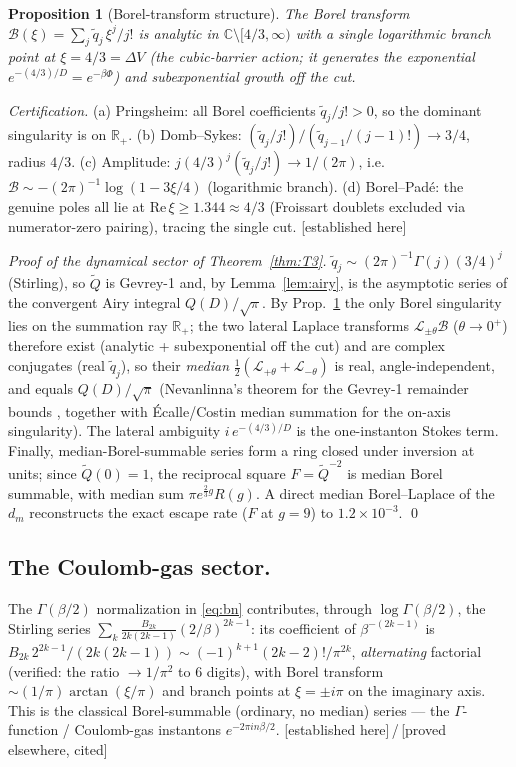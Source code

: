 \documentclass[11pt,reqno]{amsart}
\theoremstyle{plain}
\newtheorem{proposition}[theorem]{Proposition}
\theoremstyle{definition}
\theoremstyle{remark}
\newcommand{\R}{\mathbb{R}}
\newcommand{\C}{\mathbb{C}}
\newcommand{\tagPr}{{\footnotesize\textsf{[established here]}}}
\newcommand{\tagP}{{\footnotesize\textsf{[proved elsewhere, cited]}}}
\begin{document}
\begin{proposition}[Borel-transform structure]\label{prop:borel}
The Borel transform $\mathcal B(\xi)=\sum_j \tilde q_j\,\xi^j/j!$ is analytic in $\C\setminus[4/3,\infty)$
with a single logarithmic branch point at $\xi=4/3=\Delta V$ (the cubic-barrier action; it generates
the exponential $e^{-(4/3)/D}=e^{-\beta\Phi}$) and subexponential growth off the cut.
\end{proposition}
\emph{Certification.} (a) Pringsheim: all Borel coefficients $\tilde q_j/j!>0$, so the dominant
singularity is on $\R_+$. (b) Domb--Sykes: $(\tilde q_j/j!)/(\tilde q_{j-1}/(j-1)!)\to 3/4$, radius
$4/3$. (c) Amplitude: $j(4/3)^j(\tilde q_j/j!)\to 1/(2\pi)$, i.e.\ $\mathcal B\sim-(2\pi)^{-1}\log(1-3\xi/4)$
(logarithmic branch). (d) Borel--Pad\'e: the genuine poles all lie at $\mathrm{Re}\,\xi\ge1.344\approx4/3$
(Froissart doublets excluded via numerator-zero pairing), tracing the single cut. \tagPr

\begin{proof}[Proof of the dynamical sector of Theorem~\ref{thm:T3}]
$\tilde q_j\sim(2\pi)^{-1}\Gamma(j)(3/4)^j$ (Stirling), so $\tilde Q$ is Gevrey-1 and, by
Lemma~\ref{lem:airy}, is the asymptotic series of the convergent Airy integral $Q(D)/\sqrt\pi$. By
Prop.~\ref{prop:borel} the only Borel singularity lies on the summation ray $\R_+$; the two lateral
Laplace transforms $\mathcal L_{\pm\theta}\mathcal B$ ($\theta\to0^+$) therefore exist (analytic +
subexponential off the cut) and are complex conjugates (real $\tilde q_j$), so their \emph{median}
$\tfrac12(\mathcal L_{+\theta}+\mathcal L_{-\theta})$ is real, angle-independent, and equals
$Q(D)/\sqrt\pi$ (Nevanlinna's theorem for the Gevrey-1 remainder bounds \cite{Sokal}, together with
\'Ecalle/Costin median summation \cite{Costin} for the on-axis singularity). The lateral ambiguity
$i\,e^{-(4/3)/D}$ is the one-instanton Stokes term. Finally, median-Borel-summable series form a ring
closed under inversion at units; since $\tilde Q(0)=1$, the reciprocal square $F=\tilde Q^{-2}$ is
median Borel summable, with median sum $\pi e^{\frac23 g}R(g)$. A direct median Borel--Laplace of the
$d_m$ reconstructs the exact escape rate ($F$ at $g=9$) to $1.2\times10^{-3}$. \qed
\end{proof}

\subsection{The Coulomb-gas sector.}
The $\Gamma(\beta/2)$ normalization in \eqref{eq:bn} contributes, through
$\log\Gamma(\beta/2)$, the Stirling series $\sum_k \tfrac{B_{2k}}{2k(2k-1)}(2/\beta)^{2k-1}$: its
coefficient of $\beta^{-(2k-1)}$ is $B_{2k}\,2^{2k-1}/(2k(2k-1))\sim(-1)^{k+1}(2k-2)!/\pi^{2k}$,
\emph{alternating} factorial (verified: the ratio $\to 1/\pi^2$ to $6$ digits), with Borel transform
$\sim(1/\pi)\arctan(\xi/\pi)$ and branch points at $\xi=\pm i\pi$ on the imaginary axis. This is the
classical Borel-summable (ordinary, no median) series --- the $\Gamma$-function / Coulomb-gas
instantons $e^{-2\pi i n\beta/2}$. \tagPr\,/\,\tagP
\end{document}
